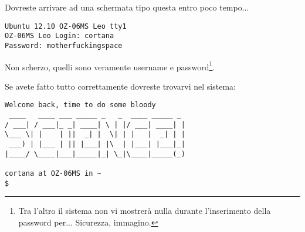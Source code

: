 \documentclass[a4paper]{memoir}
\begin{document}
		Dovreste arrivare ad una schermata tipo questa entro poco tempo...
		
		\begin{Verbatim}[label=Login + Password]
Ubuntu 12.10 OZ-06MS Leo tty1
OZ-06MS Leo Login: cortana
Password: motherfuckingspace
		\end{Verbatim}

		Non scherzo, quelli sono veramente username e password\footnote{Tra l'altro il sistema non vi mostrerà
		nulla durante l'inserimento della password per... Sicurezza, immagino.}.
		
		Se avete fatto tutto correttamente dovreste trovarvi nel sistema:

		\begin{Verbatim}[label=Party like it's 1990!]
Welcome back, time to do some bloody
 ____   ____ ___ _____ _   _  ____ _____ _ 
/ ___| / ___|_ _| ____| \ | |/ ___| ____| |
\___ \| |    | ||  _| |  \| | |   |  _| | |
 ___) | |___ | || |___| |\  | |___| |___|_|
|____/ \____|___|_____|_| \_|\____|_____(_)

cortana at OZ-06MS in ~
$ 
		\end{Verbatim}
\end{document}
